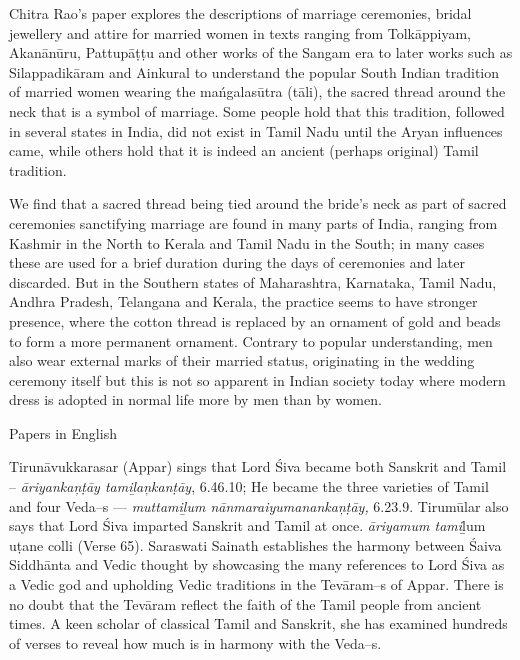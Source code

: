 Chitra Rao’s paper explores the descriptions of marriage ceremonies, bridal jewellery and attire for married women in texts ranging from Tolkāppiyam, Akanānūru, Pattupāṭṭu and other works of the Sangam era to later works such as Silappadikāram and Ainkural to understand the popular South Indian tradition of married women wearing the mańgalasūtra (tāli), the sacred thread around the neck that is a symbol of marriage. Some people hold that this tradition, followed in several states in India, did not exist in Tamil Nadu until the Aryan influences came, while others hold that it is indeed an ancient (perhaps original) Tamil tradition.

We find that a sacred thread being tied around the bride's neck as part of sacred ceremonies sanctifying marriage are found in many parts of India, ranging from Kashmir in the North to Kerala and Tamil Nadu in the South; in many cases these are used for a brief duration during the days of ceremonies and later discarded. But in the Southern states of Maharashtra, Karnataka, Tamil Nadu, Andhra Pradesh, Telangana and Kerala, the practice seems to have stronger presence, where the cotton thread is replaced by an ornament of gold and beads to form a more permanent ornament. Contrary to popular understanding, men also wear external marks of their married status, originating in the wedding ceremony itself but this is not so apparent in Indian society today where modern dress is adopted in normal life more by men than by women.

Papers in English

Tirunāvukkarasar (Appar) sings that Lord Śiva became both Sanskrit and Tamil – \textit{āriyankaņṭāy tamiḻaņkanṭāy}, 6.46.10; He became the three varieties of Tamil and four Veda–s –– \textit{muttamiḻum nānmaraiyumanankaņ\break ṭāy,} 6.23.9. Tirumūlar also says that Lord Śiva imparted Sanskrit and Tamil at once. \textit{āriyamum tami}ḻum uṭane colli (Verse 65). Saraswati Sainath establishes the harmony between Śaiva Siddhānta and Vedic thought by showcasing the many references to Lord Śiva as a Vedic god and upholding Vedic traditions in the Tevāram–s of Appar. There is no doubt that the Tevāram reflect the faith of the Tamil people from ancient times. A keen scholar of classical Tamil and Sanskrit, she has examined hundreds of verses to reveal how much is in harmony with the Veda–s.

